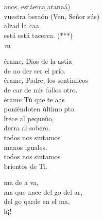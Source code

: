 \documentclass[12pt]{article}
\begin{document}
\begin{multicols*}{2}
\begin{cancion}%
{}\vspace*{-0.4cm}\\
	         \\
	anos, estáerca aranaá)\\
	vuestra beraón (Ven, Señor sús)\\
	alzad la caa,\\
	está está tacerca. (***)\\
\jump
	va  \\
\end{cancion}%

\begin{cancion}%
	érame, Dios de la astia\\
	de no der ser el prio.\\
	érame, Padre,  los sentimieos\\
	de car de mis fallos otro.\\
	érame Tú que te aas\\
	poniéndoten último pto.\\
	ltece al pequeño, \\
	derra al sobero.\\
	 todos nos sintamos \\
	manos iguales.\\
	 todos nos sintamos\\
	brientos de Ti.\\
\end{cancion}%

\begin{cancion}%
	ma de a va,\\
	ma que nace del go del ar,\\
	del go qarde en el ma,\\
	h¡! \\
\end{cancion}%


\end{multicols*}
\end{document}
